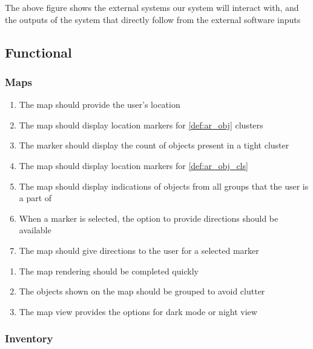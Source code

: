 \documentclass{article}
\begin{document}
The above figure shows the external systems our system will interact with, and the outputs of the system that directly follow from the external software inputs

\subsection{Functional}
\label{sub:functional}


\subsubsection{Maps}
\label{ssub:maps}

\begin{enumerate}[align=left, label=\textbf{MP-FR\arabic*:}]
    \item The map should provide the user's location
    \item The map should display location markers for \ref{def:ar_obj} clusters
    \item The marker should display the count of objects present in a tight cluster
    \item The map should display location markers for \ref{def:ar_obj_cls}
    \item The map should display indications of objects from all groups that the user is a part of
    \item When a marker is selected, the option to provide directions should be available
    \item The map should give directions to the user for a selected marker
\end{enumerate}

\begin{enumerate}[align=left, label=\textbf{MP-NFR\arabic*:}]
    \item The map rendering should be completed quickly
    \item The objects shown on the map should be grouped to avoid clutter
    \item The map view provides the options for dark mode or night view
\end{enumerate}

\subsubsection{Inventory}
\label{ssub:inventory}
\end{document}
